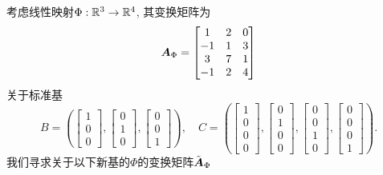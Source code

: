 \begin{example}[基变换]
    考虑线性映射$\Phi:\mathbb{R}^3 \rightarrow \mathbb{R}^4$, 其变换矩阵为
    \begin{equation}
        \boldsymbol{A}_\Phi =
        \begin{bmatrix}
            1 & 2 & 0 \\
           -1 & 1 & 3 \\
            3 & 7 & 1 \\
           -1 & 2 & 4 \\
        \end{bmatrix}
    \end{equation}
    关于标准基
    \begin{equation}
        B = (
            \begin{bmatrix} 1 \\ 0 \\ 0 \end{bmatrix},
            \begin{bmatrix} 0 \\ 1 \\ 0 \end{bmatrix},
            \begin{bmatrix} 0 \\ 0 \\ 1 \end{bmatrix}
        ), \quad
        C = (
            \begin{bmatrix} 1 \\ 0 \\ 0 \\ 0 \end{bmatrix},
            \begin{bmatrix} 0 \\ 1 \\ 0 \\ 0 \end{bmatrix},
            \begin{bmatrix} 0 \\ 0 \\ 1 \\ 0 \end{bmatrix},
            \begin{bmatrix} 0 \\ 0 \\ 0 \\ 1 \end{bmatrix}
        ).
    \end{equation}
    我们寻求关于以下新基的$\Phi$的变换矩阵$\tilde{\boldsymbol{A}}_\Phi$
    \begin{equation}

\end{equation}
\end{example}
